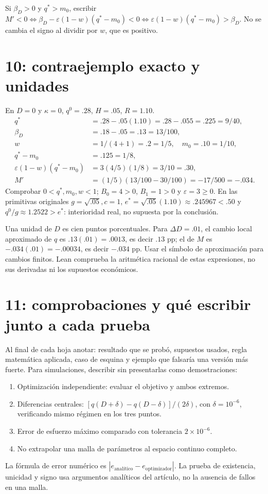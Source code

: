 \documentclass[11pt]{article}
\begin{document}
Si $\beta_D>0$ y $q^*>m_0$, escribir
$M'<0\iff\beta_D-\varepsilon(1-w)(q^*-m_0)<0
\iff\varepsilon(1-w)(q^*-m_0)>\beta_D$.
No se cambia el signo al dividir por $w$, que es positivo.

\section{10: contraejemplo exacto y unidades}
En $D=0$ y $\kappa=0$, $q^0=.28$, $H=.05$, $R=1.10$.
\begin{align*}
q^*&=.28-.05(1.10)=.28-.055=.225=9/40,\\
\beta_D&=.18-.05=.13=13/100,\\
w&=1/(4+1)=.2=1/5,\quad m_0=.10=1/10,\\
q^*-m_0&=.125=1/8,\\
\varepsilon(1-w)(q^*-m_0)&=3(4/5)(1/8)=3/10=.30,\\
M'&=(1/5)(13/100-30/100)=-17/500=-.034.
\end{align*}
Comprobar $0<q^*,m_0,w<1$; $B_0=4>0$, $B_1=1>0$ y $\varepsilon=3\ge0$.
En las primitivas originales $g=\sqrt{.05},c=1$,
$e^*=\sqrt{.05}(1.10)\approx.245967<.50$ y
$q^0/g\approx1.2522>e^*$: interioridad real, no supuesta por la conclusión.

Una unidad de $D$ es cien puntos porcentuales. Para $\Delta D=.01$,
el cambio local aproximado de $q$ es $.13(.01)=.0013$, es decir $.13$ pp;
el de $M$ es $-.034(.01)=-.00034$, es decir $-.034$ pp. Usar el símbolo
de aproximación para cambios finitos. Lean comprueba la aritmética racional
de estas expresiones, no sus derivadas ni los supuestos económicos.

\section{11: comprobaciones y qué escribir junto a cada prueba}
Al final de cada hoja anotar: resultado que se probó, supuestos usados, regla
matemática aplicada, caso de esquina y ejemplo que falsaría una versión más
fuerte. Para simulaciones, describir sin presentarlas como demostraciones:
\begin{enumerate}
\item Optimización independiente: evaluar el objetivo y ambos extremos.
\item Diferencias centrales: $[q(D+\delta)-q(D-\delta)]/(2\delta)$,
con $\delta=10^{-6}$, verificando mismo régimen en los tres puntos.
\item Error de esfuerzo máximo comparado con tolerancia $2\times10^{-6}$.
\item No extrapolar una malla de parámetros al espacio continuo completo.
\end{enumerate}
La fórmula de error numérico es $|e_{\text{analítico}}-e_{\text{optimizador}}|$.
La prueba de existencia, unicidad y signo usa argumentos analíticos del
artículo, no la ausencia de fallos en una malla.
\end{document}
